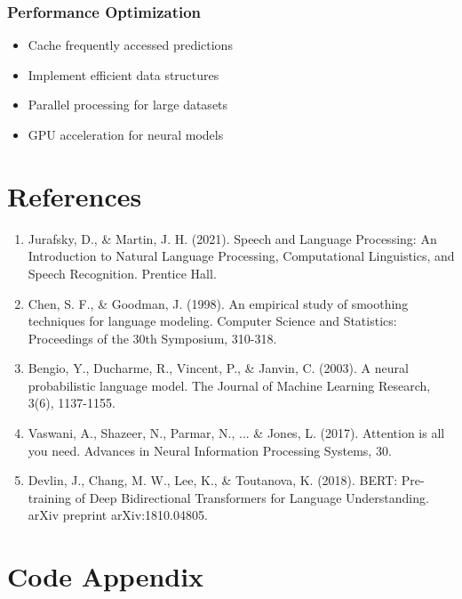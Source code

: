 \documentclass[12pt,a4paper]{report}
\begin{document}
\subsection{Performance Optimization}
\begin{itemize}
    \item Cache frequently accessed predictions
    \item Implement efficient data structures
    \item Parallel processing for large datasets
    \item GPU acceleration for neural models
\end{itemize}

\chapter{References}

\begin{enumerate}
    \item Jurafsky, D., \& Martin, J. H. (2021). Speech and Language Processing: An Introduction to Natural Language Processing, Computational Linguistics, and Speech Recognition. Prentice Hall.
    
    \item Chen, S. F., \& Goodman, J. (1998). An empirical study of smoothing techniques for language modeling. Computer Science and Statistics: Proceedings of the 30th Symposium, 310-318.
    
    \item Bengio, Y., Ducharme, R., Vincent, P., \& Janvin, C. (2003). A neural probabilistic language model. The Journal of Machine Learning Research, 3(6), 1137-1155.
    
    \item Vaswani, A., Shazeer, N., Parmar, N., ... \& Jones, L. (2017). Attention is all you need. Advances in Neural Information Processing Systems, 30.
    
    \item Devlin, J., Chang, M. W., Lee, K., \& Toutanova, K. (2018). BERT: Pre-training of Deep Bidirectional Transformers for Language Understanding. arXiv preprint arXiv:1810.04805.
\end{enumerate}

\appendix

\chapter{Code Appendix}
\end{document}
